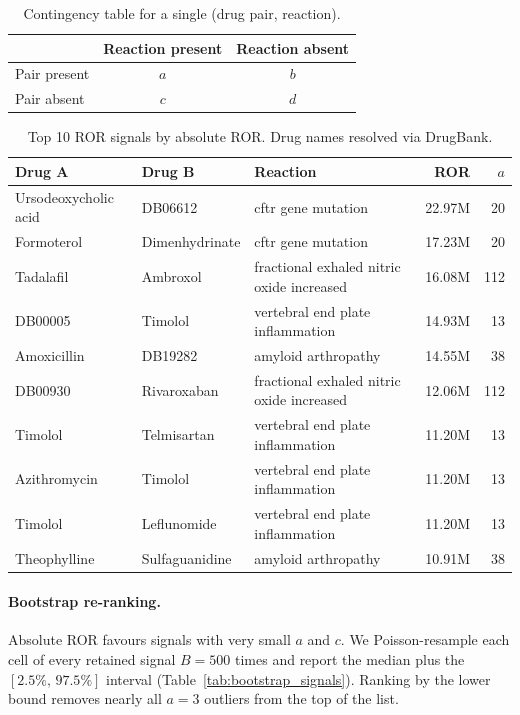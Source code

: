 \documentclass{article}
\begin{document}
\begin{table}[H]
\centering
\caption{Contingency table for a single (drug pair, reaction).}
\label{tab:contingency}
\begin{tabular}{lcc}
\toprule
 & Reaction present & Reaction absent \\
\midrule
Pair present & $a$ & $b$ \\
Pair absent & $c$ & $d$ \\
\bottomrule
\end{tabular}
\end{table}

\begin{table}[H]
\centering
\caption{Top 10 ROR signals by absolute ROR. Drug names resolved via DrugBank.}
\label{tab:top_signals}
\small
\begin{tabular}{llp{4.5cm}rr}
\toprule
Drug A & Drug B & Reaction & ROR & $a$ \\
\midrule
Ursodeoxycholic acid & DB06612 & cftr gene mutation & 22.97M & 20 \\
Formoterol & Dimenhydrinate & cftr gene mutation & 17.23M & 20 \\
Tadalafil & Ambroxol & fractional exhaled nitric oxide increased & 16.08M & 112 \\
DB00005 & Timolol & vertebral end plate inflammation & 14.93M & 13 \\
Amoxicillin & DB19282 & amyloid arthropathy & 14.55M & 38 \\
DB00930 & Rivaroxaban & fractional exhaled nitric oxide increased & 12.06M & 112 \\
Timolol & Telmisartan & vertebral end plate inflammation & 11.20M & 13 \\
Azithromycin & Timolol & vertebral end plate inflammation & 11.20M & 13 \\
Timolol & Leflunomide & vertebral end plate inflammation & 11.20M & 13 \\
Theophylline & Sulfaguanidine & amyloid arthropathy & 10.91M & 38 \\
\bottomrule
\end{tabular}
\end{table}

\paragraph{Bootstrap re-ranking.} Absolute ROR favours signals with very small $a$ and $c$. We Poisson-resample each cell of every retained signal $B{=}500$ times and report the median plus the $[2.5\%,\,97.5\%]$ interval (Table~\ref{tab:bootstrap_signals}). Ranking by the lower bound removes nearly all $a\!=\!3$ outliers from the top of the list.
\end{document}
